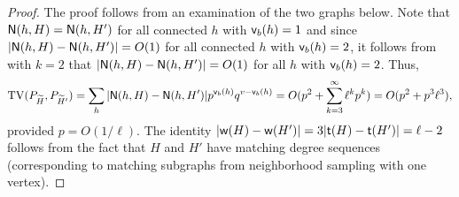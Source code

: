 \begin{proof}
The proof follows from an examination of the two graphs below. Note that $ {\mathsf{N}}(h, H) = {\mathsf{N}}(h, H') $ for all connected $ h $ with $ {\mathsf{v}}_b(h) = 1 $ and since $ |{\mathsf{N}}(h, H) - {\mathsf{N}}(h, H')| = O(1) $ for all connected $ h $ with $ {\mathsf{v}}_b(h) = 2 $, it follows from  with $ k = 2 $ that $ |{\mathsf{N}}(h, H) - {\mathsf{N}}(h, H')| = O(1) $ for all $ h $ with $ {\mathsf{v}}_b(h) = 2 $. Thus,
\begin{equation*}
{\rm TV}(P_{{\widetilde{H}}}, P_{{\widetilde{H}}'}) = \sum_h | {\mathsf{N}}(h, H) - {\mathsf{N}}(h, H')|p^{{\mathsf{v}}_b(h)}q^{v - {\mathsf{v}}_b(h)} = O(p^2 + \sum_{k=3}^{\infty} \ell^kp^k) = O(p^2 + p^3\ell^3),
\end{equation*}
provided $ p = O(1/\ell) $.
The identity $ |{\mathsf{w}}(H) - {\mathsf{w}}(H')| = 3|{\mathsf{t}}(H) - {\mathsf{t}}(H')| = \ell-2 $ follows from the fact that $ H $ and $ H' $ have matching degree sequences (corresponding to matching subgraphs from neighborhood sampling with one vertex).


\end{proof}
